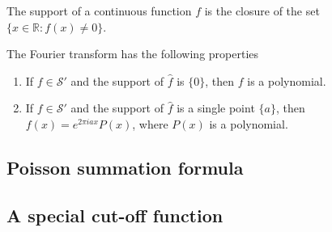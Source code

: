 The support of a continuous function $f$ is the closure  of the set $\{x\in \mathbb{R}: f(x)\neq 0\}$.
\begin{properties}
The Fourier transform has the following properties
\begin{enumerate}
\item If $f\in \mathcal{S}'$ and the support of $\hat f$ is $\{0\}$, then $f$ is a polynomial.
\item If $f\in \mathcal{S}'$ and the support of $\hat f$ is a single point $\{a\}$, then $f(x)=e^{2\pi iax}P(x)$, where $P(x)$ is a polynomial.
\end{enumerate}
\end{properties}







\subsection{Poisson summation formula}

\subsection{A special cut-off function}

